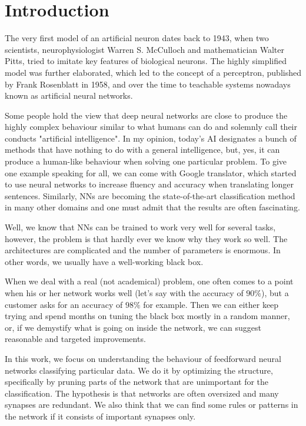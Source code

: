 \chapter{Introduction} \label{chap:introduction}
The very first model of an artificial neuron dates back to 1943, when two scientists, neurophysiologist Warren S. McCulloch and mathematician Walter Pitts, tried to imitate key features of biological neurons. The highly simplified model was further elaborated, which led to the concept of a perceptron, published by Frank Rosenblatt in 1958, and over the time to teachable systems nowadays known as artificial neural networks.

Some people hold the view that deep neural networks are close to produce the highly complex behaviour similar to what humans can do and solemnly call their conducts "artificial intelligence". In my opinion, today's AI designates a bunch of methods that have nothing to do with a general intelligence, but, yes, it can produce a human-like behaviour when solving one particular problem. To give one example speaking for all, we can come with Google translator, which started to use neural networks to increase fluency and accuracy when translating longer sentences. Similarly, NNs are becoming the state-of-the-art classification method in many other domains and one must admit that the results are often fascinating.

Well, we know that NNs can be trained to work very well for several tasks, however, the problem is that hardly ever we know why they work so well. The architectures are complicated and the number of parameters is enormous. In other words, we usually have a well-working black box.

When we deal with a real (not academical) problem, one often comes to a point when his or her network works well (let's say with the accuracy of $ 90\% $), but a customer asks for an accuracy of $ 98\% $ for example. Then we can either keep trying and spend months on tuning the black box mostly in a random manner, or, if we demystify what is going on inside the network, we can suggest reasonable and targeted improvements.

In this work, we focus on understanding the behaviour of feedforward neural networks classifying particular data. We do it by optimizing the structure, specifically by pruning parts of the network that are unimportant for the classification. The hypothesis is that networks are often oversized and many synapses are redundant. We also think that we can find some rules or patterns in the network if it consists of important synapses only.

